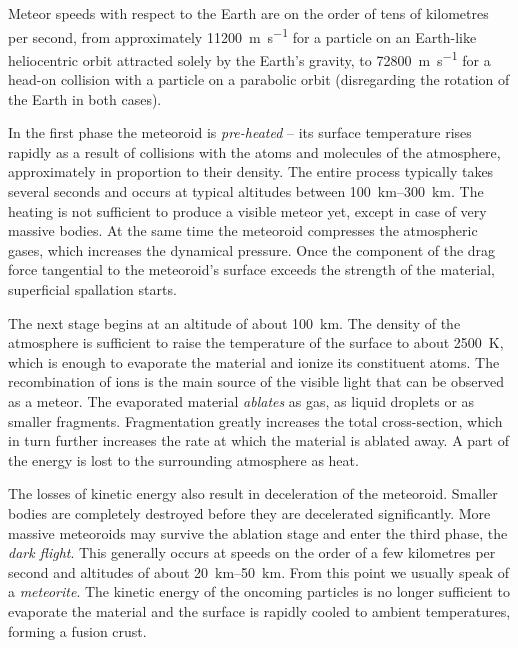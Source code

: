         Meteor speeds with respect to the Earth are on the order of tens of kilometres per second,
        from approximately \SI{11200}{\metre\per\second} for a particle on an Earth-like
        heliocentric orbit attracted solely by the Earth's gravity, to \SI{72800}{\metre\per\second}
        for a head-on collision with a particle on a parabolic orbit (disregarding the rotation of the Earth in both cases).

        In the first phase the meteoroid is \emph{pre-heated} -- its surface temperature rises rapidly
        as a result of collisions with the atoms and molecules of the atmosphere,
        approximately in proportion to their density.
        The entire process typically takes several seconds and occurs at typical altitudes
        between \SIrange{100}{300}{\kilo\metre}. The heating is not sufficient to produce a visible meteor yet,
        except in case of very massive bodies. At the same time the meteoroid compresses
        the atmospheric gases, which increases the dynamical pressure. Once the component of the drag force
        tangential to the meteoroid's surface exceeds the strength of the material,
        superficial spallation starts.

        The next stage begins at an altitude of about \SI{100}{\kilo\metre}.
        The density of the atmosphere is sufficient to raise the temperature of the surface
        to about \SI{2500}{\kelvin}, which is enough to evaporate the material and ionize its constituent atoms.
        The recombination of ions is the main source of the visible light that can be observed as a meteor.
        The evaporated material \emph{ablates} as gas, as liquid droplets or as smaller fragments.
        Fragmentation greatly increases the total cross-section, which in turn
        further increases the rate at which the material is ablated away.
        A part of the energy is lost to the surrounding atmosphere as heat.

        The losses of kinetic energy also result in deceleration of the meteoroid.
        Smaller bodies are completely destroyed before they are decelerated significantly.
        More massive meteoroids may survive the ablation stage and enter the third phase, the \emph{dark flight}.
        This generally occurs at speeds on the order of a few kilometres per second and altitudes of about \SIrange{20}{50}{\kilo\metre}.
        From this point we usually speak of a \emph{meteorite}.
        The kinetic energy of the oncoming particles is no longer sufficient to evaporate the material
        and the surface is rapidly cooled to ambient temperatures, forming a fusion crust.

